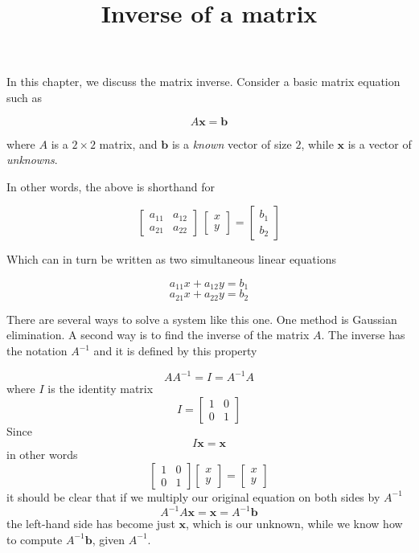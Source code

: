 \documentclass[11pt, oneside]{article}
\title{Inverse of a matrix}
\date{}
\begin{document}
\maketitle
\Large

In this chapter, we discuss the matrix inverse.  Consider a basic matrix equation such as 

\[ A \mathbf{x} = \mathbf{b} \]

where $A$ is a $2 \times 2$ matrix, and $\mathbf{b}$ is a \emph{known} vector of size $2$, while $\mathbf{x}$ is a vector of \emph{unknowns}.  

In other words, the above is shorthand for

\[
\begin{bmatrix}
a_{11} & a_{12} \\
a_{21} & a_{22}
 \end{bmatrix}
\
\begin{bmatrix}
x \\
y
 \end{bmatrix}
=
\begin{bmatrix}
b_1 \\
b_2
 \end{bmatrix}
 \]
 
 Which can in turn be written as two simultaneous linear equations
 
\[ a_{11} x +  a_{12} y = b_1 \]
\[ a_{21} x +  a_{22} y = b_2 \]

There are several ways to solve a system like this one.  One method is Gaussian elimination.  A second way is to find the inverse of the matrix $A$.  The inverse has the notation $A^{-1}$ and it is defined by this property

\[ A A^{-1}= I = A^{-1} A \]
where $I$ is the identity matrix
\[ I = 
\begin{bmatrix}
1 & 0 \\
0 & 1
 \end{bmatrix}
\]
Since
\[ I \mathbf{x} = \mathbf{x} \]
in other words
\[ 
\begin{bmatrix}
1 & 0 \\
0 & 1
 \end{bmatrix}
\begin{bmatrix}
x \\
y
 \end{bmatrix}
=
\begin{bmatrix}
x \\
y
 \end{bmatrix}
 \]
it should be clear that if we multiply our original equation on both sides by $A^{-1}$
\[ A^{-1} A \mathbf{x} = \mathbf{x} =  A^{-1} \mathbf{b} \]
the left-hand side has become just $\mathbf{x}$, which is our unknown, while we know how to compute $A^{-1} \mathbf{b}$, given $A^{-1}$.
\end{document}
